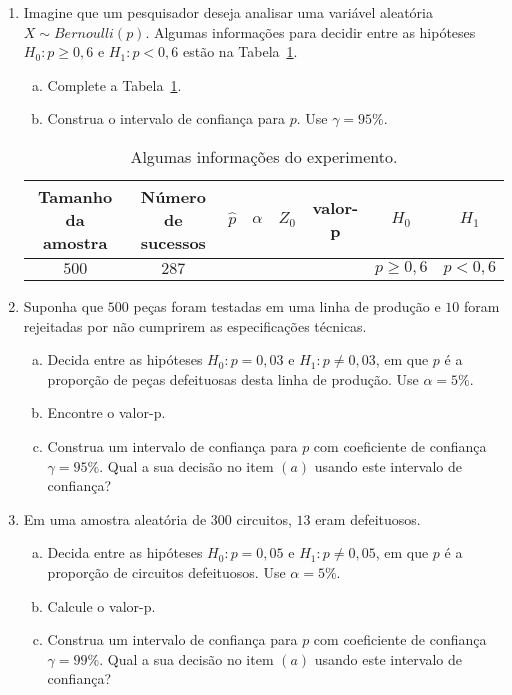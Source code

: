 \documentclass[12pt, a4paper]{article}
\begin{document}
\begin{enumerate}
	\item Imagine que um pesquisador deseja analisar uma variável aleatória $X \sim Bernoulli(p)$. Algumas informações para decidir entre as hipóteses $H_0: p \geq 0,6$ e $H_1: p < 0,6$ estão na Tabela~\ref{tab:unilateral-tab-prop}.
	\begin{enumerate}[(a)]
		\item Complete a Tabela~\ref{tab:unilateral-tab-prop}.
		\item Construa o intervalo de confiança para $p$. Use $\gamma=95\%$.
	\end{enumerate}
	\begin{table}[htbp]
		\centering
		\begin{tabular}{c|c|c|c|c|c|c|c}
			\toprule[0.05cm]
			Tamanho da amostra & Número de sucessos & $\hat{p}$ & $\alpha$ & $Z_0$ & valor-p & $H_0$ & $H_1$\\ \midrule[0.05cm]
			$500$ & $287$ & & & & & $p\geq 0,6$ & $p < 0,6$ \\ \bottomrule[0.05cm]
		\end{tabular}
		\caption{Algumas informações do experimento.}
		\label{tab:unilateral-tab-prop}
	\end{table}

	\item Suponha que $500$ peças foram testadas em uma linha de produção e $10$ foram rejeitadas por não cumprirem as especificações técnicas.
	\begin{enumerate}[(a)]
		\item Decida entre as hipóteses $H_0: p=0,03$ e $H_1: p \neq 0,03$, em que $p$ é a proporção de peças defeituosas desta linha de produção. Use $\alpha=5\%$.
		\item Encontre o valor-p.
		\item Construa um intervalo de confiança para $p$ com coeficiente de confiança $\gamma=95\%$. Qual a sua decisão no item $(a)$ usando este intervalo de confiança?
	\end{enumerate}

	\item Em uma amostra aleatória de $300$ circuitos, $13$ eram defeituosos.
	\begin{enumerate}[(a)]
		\item Decida entre as hipóteses $H_0: p = 0,05$ e $H_1: p \neq 0,05$, em que $p$ é a proporção de circuitos defeituosos. Use $\alpha = 5\%$.
		\item Calcule o valor-p.
		\item Construa um intervalo de confiança para $p$ com coeficiente de confiança $\gamma=99\%$. Qual a sua decisão no item $(a)$ usando este intervalo de confiança?
	\end{enumerate}


\end{enumerate}
\end{document}
